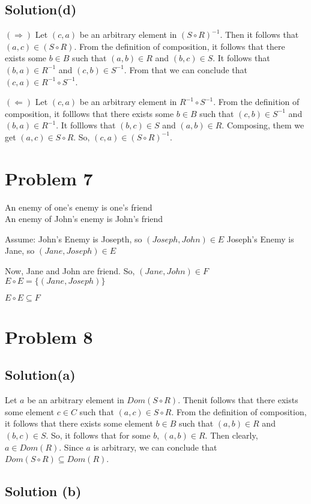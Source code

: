 \documentclass{article}
\begin{document}
\subsection{Solution(d)}
\noindent

$(\Rightarrow)$ Let $(c,a)$ be an arbitrary element in $(S \circ
R)^{-1}$. Then it follows that $(a,c) \in (S \circ R)$. From the
definition of composition, it follows that there exists some $b \in B$
such that $(a,b) \in R$ and $(b,c) \in S$. It follows that $(b,a) \in
R^{-1}$ and $(c,b) \in S^{-1}$. From that we can conclude that $(c,a)
\in R^{-1} \circ S^{-1}$.

$(\Leftarrow)$ Let $(c,a)$ be an arbitrary element in $R^{-1} \circ
S^{-1}$. From the definition of composition, it folllows that there
exists some $b \in B$ such that $(c,b) \in S^{-1}$ and $(b,a) \in
R^{-1}$. It folllows that $(b,c) \in S$ and $(a,b) \in R$. Composing,
them we get $(a,c) \in S \circ R$. So, $(c,a) \in (S \circ R)^{-1}$.

\section{Problem 7}

An enemy of one's enemy is one's friend \\
An enemy of John's enemy is John's friend

Assume: John's Enemy is Josepth, so $(Joseph, John) \in E$
Joseph's Enemy is Jane, so $(Jane, Joseph) \in E$

Now, Jane and John are friend. So, $(Jane, John) \in F$
$E \circ E = \{(Jane, Joseph)\}$

$E \circ E \subseteq F$

\section{Problem 8}
\subsection{Solution(a)}
Let $a$ be an arbitrary element in $Dom(S \circ R)$. Thenit follows
that there exists some element $c \in C$ such that $(a,c) \in S \circ
R$. From the definition of composition, it follows that there exists
some element $b \in B$ such that $(a,b) \in R$ and $(b,c) \in S$. So,
it follows that for some $b$, $(a,b) \in R$. Then clearly, $a \in
Dom(R)$. Since $a$ is arbitrary, we can conclude that $Dom(S \circ R)
\subseteq Dom(R)$.

\subsection{Solution (b)}
\end{document}
